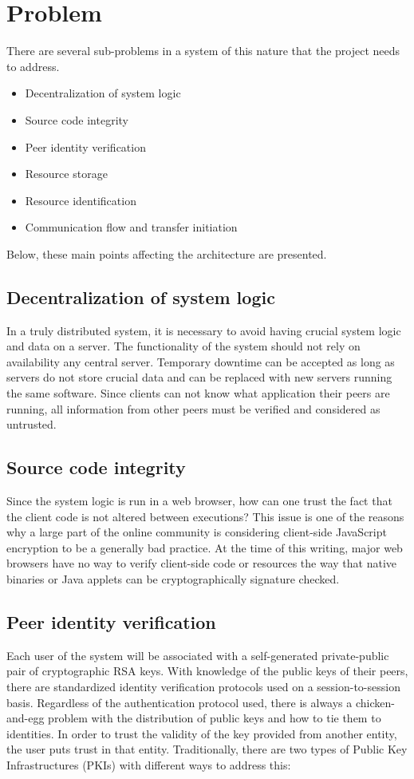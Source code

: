 \section{Problem}
\label{sec:problem}

There are several sub-problems in a system of this nature that the project needs to address.

\begin{itemize}
\item Decentralization of system logic
\item Source code integrity
\item Peer identity verification
\item Resource storage
\item Resource identification
\item Communication flow and transfer initiation
\end{itemize}

Below, these main points affecting the architecture are presented.

\subsection{Decentralization of system logic}
In a truly distributed system, it is necessary to avoid having crucial system logic and data on a server. The functionality of the system should not rely on availability any central server. Temporary downtime can be accepted as long as servers do not store crucial data and can be replaced with new servers running the same software. Since clients can not know what application their peers are running, all information from other peers must be verified and considered as untrusted. 

\subsection{Source code integrity}
Since the system logic is run in a web browser, how can one trust the fact that the client code is not altered between executions? This issue is one of the reasons why a large part of the online community is considering client-side JavaScript encryption to be a generally bad practice. At the time of this writing, major web browsers have no way to verify client-side code or resources the way that native binaries or Java applets can be cryptographically signature checked.

\subsection{Peer identity verification}
Each user of the system will be associated with a self-generated private-public pair of cryptographic RSA keys. With knowledge of the public keys of their peers, there are standardized identity verification protocols used on a session-to-session basis. Regardless of the authentication protocol used, there is always a chicken-and-egg problem with the distribution of public keys and how to tie them to identities. In order to trust the validity of the key provided from another entity, the user puts trust in that entity. Traditionally, there are two types of Public Key Infrastructures (PKIs) with different ways to address this:

